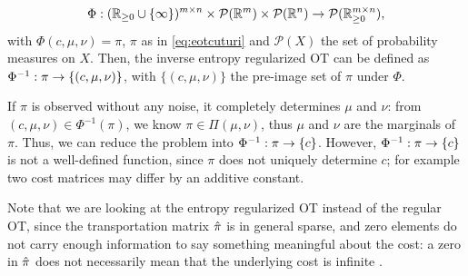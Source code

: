 \[\Phi: (\mathbb{R}_{\geq 0} \cup \{\infty\})^{m \times n} \times \mathcal{P}(\mathbb{R}^m) \times \mathcal{P}(\mathbb{R}^n) \rightarrow \mathcal{P} (\mathbb{R}_{\geq 0}^{m \times n}), \]
with $\Phi(c, \mu, \nu) = \pi$, $\pi$ as in \eqref{eq:eotcuturi} and $\mathcal{P}(X)$ the set of probability measures on $X$. Then, the inverse entropy regularized OT can be defined as $\Phi^{-1}: \pi \rightarrow \{(c, \mu, \nu)\}$, with $\{(c, \mu, \nu)\}$ the pre-image set of $\pi$ under $\Phi$. 
\vspace{0.3cm}
\begin{remark}
	If $\pi$ is observed without any noise, it completely determines $\mu$ and $\nu$: from $(c, \mu, \nu) \in \Phi^{-1}(\pi)$, we know $\pi \in \Pi(\mu, \nu)$, thus $\mu$ and $\nu$ are the marginals of $\pi$. Thus, we can reduce the problem into $\Phi^{-1}: \pi \rightarrow \{c\}$. However, $\Phi^{-1}: \pi \rightarrow \{c\}$ is not a well-defined function, since $\pi$ does not uniquely determine $c$; for example two cost matrices may differ by an additive constant. 
\end{remark}
Note that we are looking at the entropy regularized OT instead of the regular OT, since the transportation matrix $\hat{\pi}$ is in general sparse, and zero elements do not carry enough information to say something meaningful about the cost: a zero in $\hat{\pi}$ does not necessarily mean that the underlying cost is infinite \citep{chiu2022}. 





